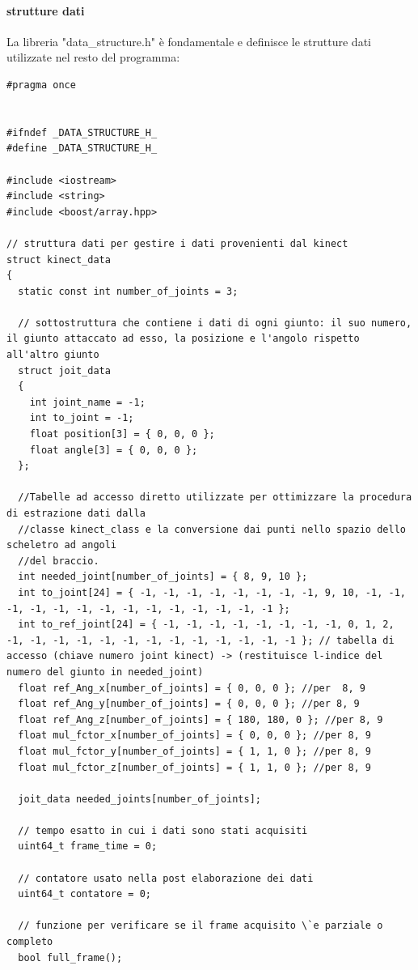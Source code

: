 \documentclass[10pt,a4paper]{article}
\begin{document}
\paragraph{strutture dati}
La libreria "data\_structure.h" \`e fondamentale e definisce le strutture dati utilizzate nel resto del programma:
\begin{lstlisting}[style=mycpp, caption=librerie usate, captionpos=b]
#pragma once


#ifndef _DATA_STRUCTURE_H_
#define _DATA_STRUCTURE_H_

#include <iostream>
#include <string>
#include <boost/array.hpp>

// struttura dati per gestire i dati provenienti dal kinect
struct kinect_data
{
  static const int number_of_joints = 3;

  // sottostruttura che contiene i dati di ogni giunto: il suo numero, il giunto attaccato ad esso, la posizione e l'angolo rispetto all'altro giunto
  struct joit_data
  {
    int joint_name = -1;
    int to_joint = -1;
    float position[3] = { 0, 0, 0 };
    float angle[3] = { 0, 0, 0 };
  };

  //Tabelle ad accesso diretto utilizzate per ottimizzare la procedura di estrazione dati dalla
  //classe kinect_class e la conversione dai punti nello spazio dello scheletro ad angoli 
  //del braccio. 
  int needed_joint[number_of_joints] = { 8, 9, 10 };
  int to_joint[24] = { -1, -1, -1, -1, -1, -1, -1, -1, 9, 10, -1, -1, -1, -1, -1, -1, -1, -1, -1, -1, -1, -1, -1, -1 };
  int to_ref_joint[24] = { -1, -1, -1, -1, -1, -1, -1, -1, 0, 1, 2, -1, -1, -1, -1, -1, -1, -1, -1, -1, -1, -1, -1, -1 }; // tabella di accesso (chiave numero joint kinect) -> (restituisce l-indice del numero del giunto in needed_joint)    
  float ref_Ang_x[number_of_joints] = { 0, 0, 0 }; //per  8, 9
  float ref_Ang_y[number_of_joints] = { 0, 0, 0 }; //per 8, 9
  float ref_Ang_z[number_of_joints] = { 180, 180, 0 }; //per 8, 9
  float mul_fctor_x[number_of_joints] = { 0, 0, 0 }; //per 8, 9
  float mul_fctor_y[number_of_joints] = { 1, 1, 0 }; //per 8, 9
  float mul_fctor_z[number_of_joints] = { 1, 1, 0 }; //per 8, 9

  joit_data needed_joints[number_of_joints];

  // tempo esatto in cui i dati sono stati acquisiti
  uint64_t frame_time = 0;

  // contatore usato nella post elaborazione dei dati
  uint64_t contatore = 0;

  // funzione per verificare se il frame acquisito \`e parziale o completo 
  bool full_frame();


\end{lstlisting}
\end{document}
